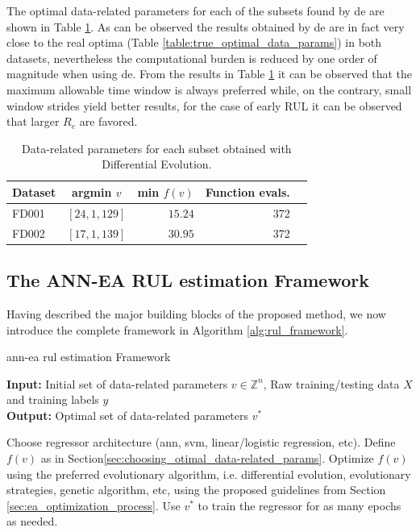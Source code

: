 \documentclass{article}
\begin{document}
The optimal data-related parameters for each of the subsets found by \gls{de} are shown in Table \ref{table:optimal_data_params}. As can be observed the results obtained by \gls{de} are in fact very close to the real optima (Table \ref{table:true_optimal_data_params}) in both datasets, nevertheless the computational burden is reduced by one order of magnitude when using \gls{de}. From the results in Table \ref{table:optimal_data_params} it can be observed that the maximum allowable time window is always preferred while, on the contrary, small window strides yield better results, for the case of early RUL it can be observed that larger $R_e$ are favored.

\begin{table}[!htb]
\centering
\begin{tabular}{l | c r r l}
	\hline
	 Dataset & argmin $v$ & min $f(v)$ & Function evals.\\
  	\hline
  	FD001 & $\left[ 24, 1, 129 \right]$ & $15.24$ & 372\\
  	FD002 & $\left[ 17, 1, 139 \right]$ & $30.95$ & 372\\
  	\hline
\end{tabular}
\caption{Data-related parameters for each subset obtained with Differential Evolution.}
\label{table:optimal_data_params}
\end{table}

\subsection{The ANN-EA RUL estimation Framework}

Having described the major building blocks of the proposed method, we now introduce the complete framework in Algorithm \ref{alg:rul_framework}.

\setcounter{algorithm}{0}
\begin{algorithm}[H]
\caption{\gls{ann}-\gls{ea} \gls{rul} estimation Framework}\label{alg:rul_framework}
\textbf{Input:} Initial set of data-related parameters $v \in \mathbb{Z}^n$, Raw training/testing data $X$ and training labels $y$\\
\textbf{Output:} Optimal set of data-related parameters $v^*$
	\begin{algorithmic}[1]
		\State Choose regressor architecture (\gls{ann}, \gls{svm}, linear/logistic regression, etc).
		\State Define $f(v)$ as in Section\ref{sec:choosing_otimal_data-related_params}.
		\State Optimize $f(v)$ using the preferred evolutionary algorithm, i.e. differential evolution, evolutionary strategies, genetic algorithm, etc, using the proposed guidelines from Section \ref{sec:ea_optimization_process}.
		\State Use $v^*$ to train the regressor for as many epochs as needed.
	\end{algorithmic}
\end{algorithm}
\end{document}
